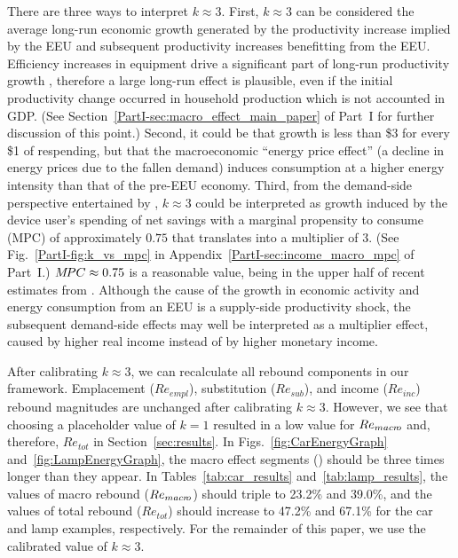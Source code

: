 \documentclass[12pt]{article}\usepackage[]{graphicx}\usepackage[]{xcolor}
\begin{document}
There are three ways to interpret $k \approx 3$.
First, $k \approx 3$ can be considered the average long-run 
economic growth generated
by the productivity increase implied by the EEU and subsequent
productivity increases benefitting from the EEU.
Efficiency increases in equipment drive a significant part of 
long-run productivity growth \citep{Greenwood1997}, therefore a large
long-run effect is plausible,
even if the initial productivity
change occurred in household production which is not accounted in GDP.
(See Section~\ref{PartI-sec:macro_effect_main_paper} of Part~I 
for further discussion of this point.)
Second, it could be that growth is less than 
\$3 for every \$1 of respending,
but that the macroeconomic ``energy price effect'' (a decline in 
energy prices due to the fallen demand) induces consumption at a higher
energy intensity than that of the pre-EEU economy. 
Third, from the demand-side perspective
entertained by \citet{Borenstein:2015aa}, 
$k \approx 3$ could be interpreted as 
growth induced by the device user's spending of net savings with
a marginal propensity to consume (MPC)
of approximately $0.75$ that translates into a multiplier of 3. 
(See Fig.~\ref{PartI-fig:k_vs_mpc} 
in Appendix~\ref{PartI-sec:income_macro_mpc} of Part~I.)
$M\!PC \approx 0.75$ is a reasonable value, 
being in the upper half of recent estimates from \citet{Carroll2017}.
Although the cause of the growth in economic activity and energy consumption from an EEU 
is a supply-side productivity shock,
the subsequent demand-side effects may well be interpreted as a multiplier effect, 
caused by higher real income instead of by higher monetary income.

After calibrating $k \approx 3$, 
we can recalculate all rebound components in our framework.
Emplacement ($Re_{empl}$), substitution ($Re_{sub}$), and income ($Re_{inc}$) rebound
magnitudes are unchanged after calibrating $k \approx 3$.
However, we see that choosing a placeholder value of $k = 1$
resulted in a low value for $Re_{macr\!o}$ and, therefore, $Re_{tot}$
in Section~\ref{sec:results}.
In Figs.~\ref{fig:CarEnergyGraph} and~\ref{fig:LampEnergyGraph},
the macro effect segments (\bartilde{})
should be three times longer than they appear.
In Tables~\ref{tab:car_results} and~\ref{tab:lamp_results},
the values of macro rebound ($Re_{macr\!o}$) should triple to
23.2\% and
39.0\%, and
the values of total rebound ($Re_{tot}$) should increase to 
47.2\% and
67.1\%
for the car and lamp examples,
respectively.
For the remainder of this paper, 
we use the calibrated value of $k \approx 3$.
\end{document}
